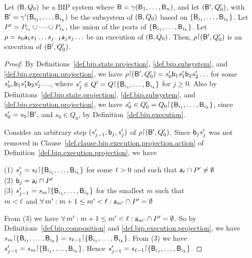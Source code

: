 \begin{proposition} \label{prop.bip.execution.projection}
Let $(\mathsf{B}, Q_0)$ be a BIP system where $\mathsf{B} = \gamma(\mathsf{B}_1,\dots,\mathsf{B}_n)$, and let
$(\mathsf{B}', Q'_0)$, with $\mathsf{B}' = \gamma'(\mathsf{B}_{i_1},\dots,\mathsf{B}_{i_k})$ be the subsystem of $(\mathsf{B}, Q_0)$ based on $\{ \mathsf{B}_{i_1},\dots,\mathsf{B}_{i_k} \}$.
Let $P' = P_{i_1} \cup \cdots \cup P_{i_k}$,  \ie the union of the ports of $\{ \mathsf{B}_{i_1},\dots,\mathsf{B}_{i_k} \}$.
Let $\rho = s_0 \mathsf{a}_1 s_1 \ldots s_{j-1} \mathsf{a}_j s_j \ldots$ be an execution of $(\mathsf{B}, Q_0)$. 
Then, $\rho \pj (\B', Q'_0)$ is an execution of $(\mathsf{B}', Q'_0)$.
\end{proposition}

\begin{proof}
By Definitions~\ref{def.bip.state.projection}, \ref{def.bip.subsystem}, and \ref{def.bip.execution.projection}, 
we have $\rho \pj (\B', Q'_0) = s'_0 \actb_1 s'_1 \actb_2 s'_2 \ldots$ for some $s'_0,\mathsf{b}_1 s'_1 \mathsf{b}_2 s'_2 \ldots$,
where $s'_j \in Q' = Q \pj \set{\B_{i_1},\dots,\B_{i_k}}$ for $j \ge 0$.
%
Also by Definitions~\ref{def.bip.state.projection}, \ref{def.bip.subsystem}, and \ref{def.bip.execution.projection}, 
we have $s'_0 \in Q'_0 = Q_0 \pj \set{\B_{i_1},\dots,\B_{i_k}}$, since $s'_0 = s_0 \pj \B'$, and $s_0 \in Q_0$, by Definition~\ref{def.bip.execution}.

Consider an arbitrary step $(s'_{j-1}, \mathsf{b}_j, s'_j)$ of $\rho \pj (\B', Q'_0)$.
Since $\mathsf{b}_j s'_j$ was not removed in Clause~\ref{def.clause.bip.execution.projection.action} of
Definition~\ref{def.bip.execution.projection}, we have 

\noindent
(1) $s'_j = s_{\l} \pj \set{\B_{i_1},\dots,\B_{i_k}}$ for some $\ell > 0$ and such that $\mathsf{a}_{\ell} \cap P' \ne \emptyset$\\                     %
(2) $\mathsf{b}_j = \mathsf{a}_{\ell} \cap P'$\\                                                              %
(3) $s'_{j-1} = s_m \pj \set{\B_{i_1},\dots,\B_{i_k}}$ for the smallest $m$ such that\\
   \ind $m < \ell$ and
        $\forall\, m' : {m+1 \leq m' < \ell} : \mathsf{a}_{m'} \cap P' = \emptyset$                              %

\noindent
From  (3) we have $\forall\, m' : {m+1 \leq m' < \ell} : \mathsf{a}_{m'} \cap P' = \emptyset$. So by Definitions~\ref{def.bip.composition} and \ref{def.bip.execution.projection},
    we have $s_m \pj \set{\B_{i_1},\dots,\B_{i_k}} = s_{\l-1} \pj \set{\B_{i_1},\dots,\B_{i_k}}$.
From (3) we have $s'_{j-1} = s_m \pj \set{\B_{i_1},\dots,\B_{i_k}}$. 
Hence $s'_{j-1} = s_{\l-1} \pj \set{\B_{i_1},\dots,\B_{i_k}}$.


\end{proof}
